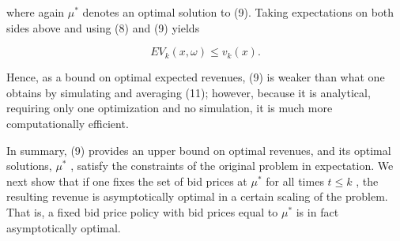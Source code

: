 where again \(\mu^{*}\) denotes an optimal solution to (9). Taking
expectations on both sides above and using (8) and (9) yields

\[
E V_{k}(x,\omega)\leq v_{k}(x).
\]

Hence, as a bound on optimal expected revenues, (9) is weaker than what
one obtains by simulating and averaging (11); however, because it is
analytical, requiring only one optimization and no simulation, it is
much more computationally efficient.

In summary, (9) provides an upper bound on optimal revenues, and its
optimal solutions, \(\mu^{*}\) , satisfy the constraints of the original
problem in expectation. We next show that if one fixes the set of bid
prices at \(\mu^{*}\) for all times \(t \leq k\) , the resulting revenue
is asymptotically optimal in a certain scaling of the problem. That is,
a fixed bid price policy with bid prices equal to \(\mu^{*}\) is in fact
asymptotically optimal.



